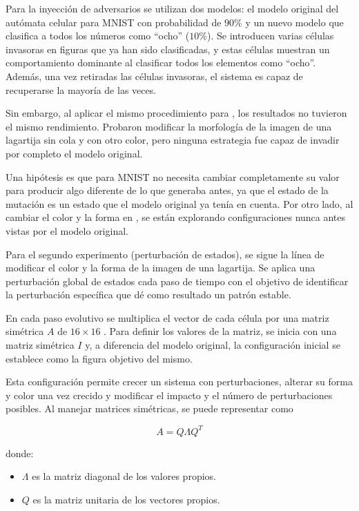 Para la inyección de adversarios se utilizan dos modelos: el modelo original del autómata celular para MNIST con probabilidad de $90\%$ y un nuevo modelo que clasifica a todos los números como ``ocho'' ($10\%$).  Se introducen varias células invasoras en figuras que ya han sido clasificadas, y estas células muestran un comportamiento dominante al clasificar todos los elementos como ``ocho''. Además, una vez retiradas las células invasoras, el sistema es capaz de recuperarse la mayoría de las veces.

Sin embargo, al aplicar el mismo procedimiento para \cite{mordvintsevNCA}, los resultados no tuvieron el mismo rendimiento. Probaron modificar la morfología de la imagen de una lagartija sin cola y con otro color, pero ninguna estrategia fue capaz de invadir por completo el modelo original. 

Una hipótesis es que para MNIST no necesita cambiar completamente su valor para producir algo diferente de lo que generaba antes, ya que el estado de la mutación es un estado que el modelo original ya tenía en cuenta. Por otro lado, al cambiar el color y la forma en \cite{mordvintsevNCA}, se están explorando configuraciones nunca antes vistas por el modelo original.

Para el segundo experimento (perturbación de estados), se sigue la línea de modificar el color y la forma de la imagen de una lagartija. Se aplica una perturbación global de estados cada paso de tiempo con el objetivo de identificar la perturbación específica que dé como resultado un patrón estable.

En cada paso evolutivo se multiplica el vector de cada célula por una matriz simétrica $A$ de $16 \times 16$ \cite{mordvintsevNCA}. Para definir los valores de la matriz, se inicia con una matriz simétrica $I$ y, a diferencia del modelo original, la configuración inicial se establece como la figura objetivo del mismo.

Esta configuración permite crecer un sistema con perturbaciones, alterar su forma y color una vez crecido y modificar el impacto y el número de perturbaciones posibles. Al manejar matrices simétricas, se puede representar como 

\[A = Q \Lambda Q^T\] 

donde: 

\begin{itemize}
	
	\item $\Lambda$ es la matriz diagonal de los valores propios.
	
	\item $Q$ es la matriz unitaria de los vectores propios.
	
\end{itemize} 

